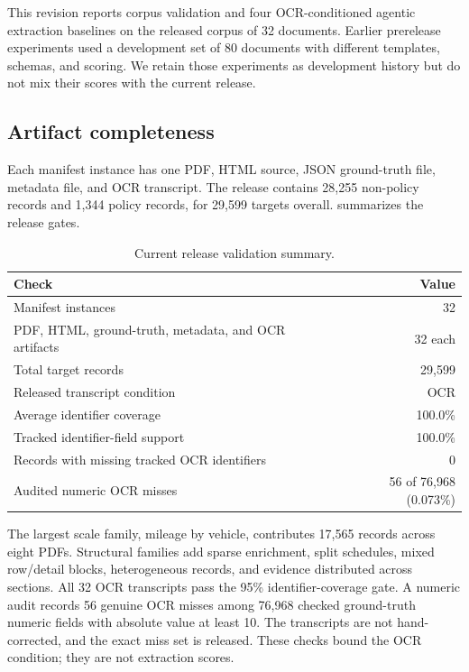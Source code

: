 This revision reports corpus validation and four OCR-conditioned agentic extraction baselines on the released corpus of 32 documents. Earlier prerelease experiments used a development set of 80 documents with different templates, schemas, and scoring. We retain those experiments as development history but do not mix their scores with the current release.

\subsection{Artifact completeness}
Each manifest instance has one PDF, HTML source, JSON ground-truth file, metadata file, and OCR transcript. The release contains 28{,}255 non-policy records and 1{,}344 policy records, for 29{,}599 targets overall.  summarizes the release gates.

\begin{table}[H]
\centering
\small
\caption{Current release validation summary.}
\label{tab:release-validation}
\begin{tabular}{@{}lr@{}}
\toprule
Check & Value \\
\midrule
Manifest instances & 32 \\
PDF, HTML, ground-truth, metadata, and OCR artifacts & 32 each \\
Total target records & 29{,}599 \\
Released transcript condition & OCR \\
Average identifier coverage & 100.0\% \\
Tracked identifier-field support & 100.0\% \\
Records with missing tracked OCR identifiers & 0 \\
Audited numeric OCR misses & 56 of 76{,}968 (0.073\%) \\
\bottomrule
\end{tabular}
\end{table}

The largest scale family, mileage by vehicle, contributes 17{,}565 records across eight PDFs. Structural families add sparse enrichment, split schedules, mixed row/detail blocks, heterogeneous records, and evidence distributed across sections. All 32 OCR transcripts pass the 95\% identifier-coverage gate. A numeric audit records 56 genuine OCR misses among 76{,}968 checked ground-truth numeric fields with absolute value at least 10. The transcripts are not hand-corrected, and the exact miss set is released. These checks bound the OCR condition; they are not extraction scores.

